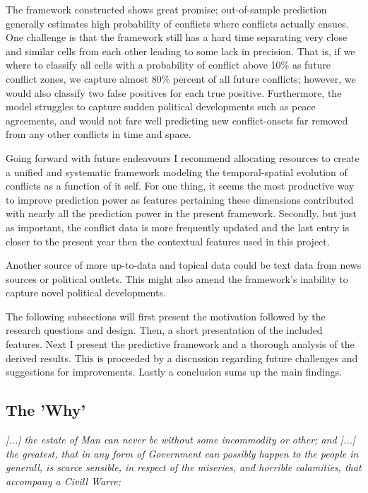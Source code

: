 \documentclass[a4paper]{article}
\begin{document}
The framework constructed shows great promise; out-of-sample prediction generally estimates high probability of conflicts where conflicts actually ensues. One challenge is that the framework still has a hard time separating very close and similar cells from each other leading to some lack in precision. That is, if we where to classify all cells with a probability of conflict above 10\% as future conflict zones, we capture almost 80\% percent of all future conflicts; however, we would also classify two false positives for each true positive. Furthermore, the model struggles to capture sudden political developments such as peace agreements, and would not fare well predicting new conflict-onsets far removed from any other conflicts in time and space.\par

Going forward with future endeavours I recommend allocating resources to create a unified and systematic framework modeling the temporal-spatial evolution of conflicts as a function of it self. For one thing, it seems the most productive way to improve prediction power as features pertaining these dimensions contributed with nearly all the prediction power in the present framework. Secondly, but just as important, the conflict data is more frequently updated and the last entry is closer to the present year then the contextual features used in this project.\par

Another source of more up-to-data and topical data could be text data from news sources or political outlets. This might also amend the framework's inability to capture novel political developments.\par

The following subsections will first present the motivation followed by the research questions and design. Then, a short presentation of the included features. Next I present the predictive framework and a thorough analysis of the derived results. This is proceeded by a discussion regarding future challenges and suggestions for improvements. Lastly a conclusion sums up the main findings.\par

\subsection{The 'Why'}

\begin{displayquote}
\emph{[...] the estate of Man can never be without some incommodity or other; and [...] the greatest, that in any form of Government can possibly happen to the people in generall, is scarce sensible, in respect of the miseries, and horrible calamities, that accompany a Civill Warre;} \cite[128]{Hobbes_1991} \par

\end{displayquote}
\end{document}
